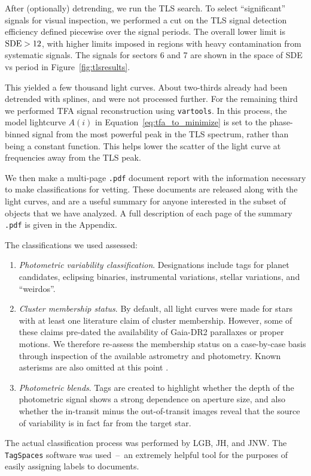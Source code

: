 \documentclass[12pt,twocolumn,tighten]{aastex62}
\begin{document}
After (optionally) detrending, we run the TLS search. To select 
``significant'' signals for visual inspection, we 
performed a cut on the TLS signal detection efficiency defined piecewise over 
the signal periods.
The overall lower limit is ${\rm SDE} > 12$, with higher limits imposed in 
regions with heavy contamination from systematic signals.
The signals for sectors 6 and 7 are shown in the space of SDE vs period in 
Figure~\ref{fig:tlsresults}.

This yielded a few thousand light curves.  About two-thirds already had been 
detrended with splines, and were not processed further.
For the remaining third we
performed TFA signal reconstruction using 
\texttt{vartools}.
In this process, the model lightcurve $A(i)$ in 
Equation~\ref{eq:tfa_to_minimize} is set to the phase-binned signal from the 
most powerful peak in the TLS spectrum, rather than being a constant function. 
This helps lower the scatter of the light curve at frequencies away from
the TLS peak.

We then make a multi-page \texttt{.pdf} document report with the information 
necessary to make classifications for vetting.
These documents are released along with the light curves, and are a useful 
summary for anyone interested in the subset of objects that we have analyzed.
A full description of each page of the summary \texttt{.pdf} is given in the 
Appendix.

The classifications we used assessed:
\begin{enumerate}
    \item {\it Photometric variability classification}. Designations include 
    tags for planet candidates, eclipsing binaries, instrumental variations, 
    stellar variations, and ``weirdos''.
    \item {\it Cluster membership status}. By default, all light curves were 
    made for stars with at least one literature claim of cluster membership.  
    However, some of these claims pre-dated the availability of Gaia-DR2
    parallaxes or proper motions.
    We therefore re-assess the membership status on a case-by-case basis 
    through inspection of the available astrometry and photometry.
    Known asterisms are also omitted at this point
    \citep[{\it e.g.},][]{sulentic_revised_1973,kos_galah_2018}.
    \item {\it Photometric blends}. Tags are created to highlight whether the 
    depth of the photometric signal shows a strong dependence on aperture 
    size, and also whether the in-transit minus the out-of-transit images 
    reveal that the source of variability is in fact far from the target star.
\end{enumerate}
The actual classification process was performed by LGB, JH, and JNW.
The \texttt{TagSpaces} software was used~--~an extremely helpful tool for the 
purposes of easily assigning labels to documents.
\end{document}
